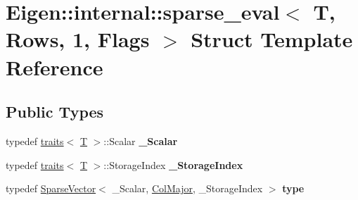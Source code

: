 \hypertarget{struct_eigen_1_1internal_1_1sparse__eval_3_01_t_00_01_rows_00_011_00_01_flags_01_4}{}\section{Eigen\+:\+:internal\+:\+:sparse\+\_\+eval$<$ T, Rows, 1, Flags $>$ Struct Template Reference}
\label{struct_eigen_1_1internal_1_1sparse__eval_3_01_t_00_01_rows_00_011_00_01_flags_01_4}
\subsection*{Public Types}
\begin{DoxyCompactItemize}
\item 
\mbox{\label{struct_eigen_1_1internal_1_1sparse__eval_3_01_t_00_01_rows_00_011_00_01_flags_01_4_a11eeffca8d2bdfb732081294d1d1332e}} 
typedef \hyperlink{struct_eigen_1_1internal_1_1traits}{traits}$<$ \hyperlink{group___sparse_core___module}{T} $>$\+::Scalar {\bfseries \+\_\+\+Scalar}
\item 
\mbox{\label{struct_eigen_1_1internal_1_1sparse__eval_3_01_t_00_01_rows_00_011_00_01_flags_01_4_af5cedca3e3a701912033b4595e6cb12d}} 
typedef \hyperlink{struct_eigen_1_1internal_1_1traits}{traits}$<$ \hyperlink{group___sparse_core___module}{T} $>$\+::Storage\+Index {\bfseries \+\_\+\+Storage\+Index}
\item 
\mbox{\label{struct_eigen_1_1internal_1_1sparse__eval_3_01_t_00_01_rows_00_011_00_01_flags_01_4_a36cdbf653debd1b9b67ea574bde18b93}} 
typedef \hyperlink{group___sparse_core___module_class_eigen_1_1_sparse_vector}{Sparse\+Vector}$<$ \+\_\+\+Scalar, \hyperlink{group__enums_ggaacded1a18ae58b0f554751f6cdf9eb13a0cbd4bdd0abcfc0224c5fcb5e4f6669a}{Col\+Major}, \+\_\+\+Storage\+Index $>$ {\bfseries type}
\item 
\mbox{\label{struct_eigen_1_1internal_1_1sparse__eval_3_01_t_00_01_rows_00_011_00_01_flags_01_4_a11eeffca8d2bdfb732081294d1d1332e}} 

\end{DoxyCompactItemize}
